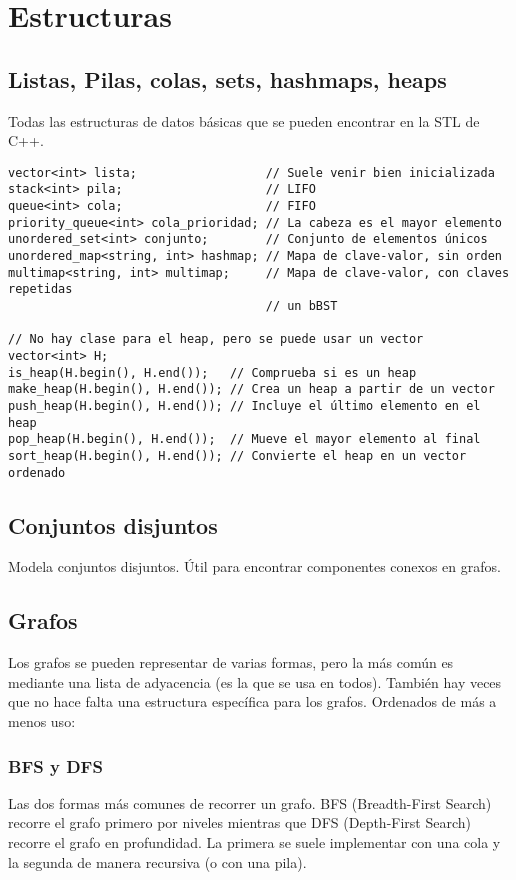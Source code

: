 \chapter{Estructuras}
\section{Listas, Pilas, colas, sets, hashmaps, heaps}
Todas las estructuras de datos básicas que se pueden encontrar en la STL de C++.

\begin{lstlisting}
vector<int> lista;                  // Suele venir bien inicializada
stack<int> pila;                    // LIFO
queue<int> cola;                    // FIFO
priority_queue<int> cola_prioridad; // La cabeza es el mayor elemento
unordered_set<int> conjunto;        // Conjunto de elementos únicos
unordered_map<string, int> hashmap; // Mapa de clave-valor, sin orden
multimap<string, int> multimap;     // Mapa de clave-valor, con claves repetidas
                                    // un bBST

// No hay clase para el heap, pero se puede usar un vector
vector<int> H;
is_heap(H.begin(), H.end());   // Comprueba si es un heap
make_heap(H.begin(), H.end()); // Crea un heap a partir de un vector
push_heap(H.begin(), H.end()); // Incluye el último elemento en el heap
pop_heap(H.begin(), H.end());  // Mueve el mayor elemento al final
sort_heap(H.begin(), H.end()); // Convierte el heap en un vector ordenado
\end{lstlisting}

\section{Conjuntos disjuntos}
Modela conjuntos disjuntos. Útil para encontrar componentes conexos en grafos.


\section{Grafos}
Los grafos se pueden representar de varias formas, pero la más común es mediante
una lista de adyacencia (es la que se usa en todos). También hay veces que no
hace falta una estructura específica para los grafos. Ordenados de más a menos
uso:

\subsection{BFS y DFS}
Las dos formas más comunes de recorrer un grafo. BFS (Breadth-First Search)
recorre el grafo primero por niveles mientras que DFS (Depth-First Search)
recorre el grafo en profundidad. La primera se suele implementar con una cola y
la segunda de manera recursiva (o con una pila).

